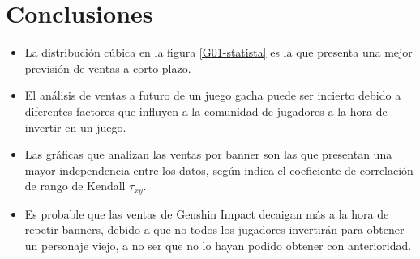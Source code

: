 \documentclass[osajnl,twocolumn,showpacs,superscriptaddress,10pt]{revtex4-2}
\begin{document}
\section{Conclusiones}
    \begin{itemize}
        \item La distribución cúbica en la figura \ref{G01-statista} es la que presenta una mejor previsión de ventas a corto plazo.
        \item El análisis de ventas a futuro de un juego gacha puede ser incierto debido a diferentes factores que influyen a la comunidad de jugadores a la hora de invertir en un juego.
        \item Las gráficas que analizan las ventas por banner son las que presentan una mayor independencia entre los datos, según indica el coeficiente de correlación de rango de Kendall $\tau_{xy}$.
        \item Es probable que las ventas de Genshin Impact decaigan más a la hora de repetir banners, debido a que no todos los jugadores invertirán para obtener un personaje viejo, a no ser que no lo hayan podido obtener con anterioridad.
    \end{itemize}

    \nocite{*}
    
\end{document}
